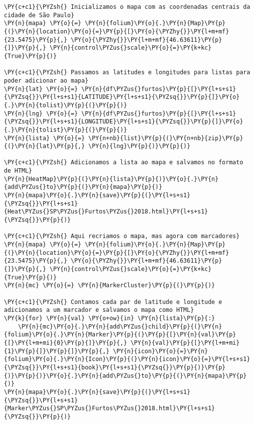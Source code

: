     \begin{tcolorbox}[breakable, size=fbox, boxrule=1pt, pad at break*=1mm,colback=cellbackground, colframe=cellborder]
\begin{Verbatim}[commandchars=\\\{\}]
\PY{c+c1}{\PYZsh{} Inicializamos o mapa com as coordenadas centrais da cidade de São Paulo}
\PY{n}{mapa} \PY{o}{=} \PY{n}{folium}\PY{o}{.}\PY{n}{Map}\PY{p}{(}\PY{n}{location}\PY{o}{=}\PY{p}{[}\PY{o}{\PYZhy{}}\PY{l+m+mf}{23.5475}\PY{p}{,} \PY{o}{\PYZhy{}}\PY{l+m+mf}{46.63611}\PY{p}{]}\PY{p}{,} \PY{n}{control\PYZus{}scale}\PY{o}{=}\PY{k+kc}{True}\PY{p}{)}

\PY{c+c1}{\PYZsh{} Passamos as latitudes e longitudes para listas para poder adicionar ao mapa}
\PY{n}{lat} \PY{o}{=} \PY{n}{df\PYZus{}furtos}\PY{p}{[}\PY{l+s+s1}{\PYZsq{}}\PY{l+s+s1}{LATITUDE}\PY{l+s+s1}{\PYZsq{}}\PY{p}{]}\PY{o}{.}\PY{n}{tolist}\PY{p}{(}\PY{p}{)}
\PY{n}{lng} \PY{o}{=} \PY{n}{df\PYZus{}furtos}\PY{p}{[}\PY{l+s+s1}{\PYZsq{}}\PY{l+s+s1}{LONGITUDE}\PY{l+s+s1}{\PYZsq{}}\PY{p}{]}\PY{o}{.}\PY{n}{tolist}\PY{p}{(}\PY{p}{)}
\PY{n}{lista} \PY{o}{=} \PY{n+nb}{list}\PY{p}{(}\PY{n+nb}{zip}\PY{p}{(}\PY{n}{lat}\PY{p}{,} \PY{n}{lng}\PY{p}{)}\PY{p}{)}

\PY{c+c1}{\PYZsh{} Adicionamos a lista ao mapa e salvamos no formato de HTML}
\PY{n}{HeatMap}\PY{p}{(}\PY{n}{lista}\PY{p}{)}\PY{o}{.}\PY{n}{add\PYZus{}to}\PY{p}{(}\PY{n}{mapa}\PY{p}{)}
\PY{n}{mapa}\PY{o}{.}\PY{n}{save}\PY{p}{(}\PY{l+s+s1}{\PYZsq{}}\PY{l+s+s1}{Heat\PYZus{}SP\PYZus{}Furtos\PYZus{}2018.html}\PY{l+s+s1}{\PYZsq{}}\PY{p}{)}

\PY{c+c1}{\PYZsh{} Aqui recriamos o mapa, mas agora com marcadores}
\PY{n}{mapa} \PY{o}{=} \PY{n}{folium}\PY{o}{.}\PY{n}{Map}\PY{p}{(}\PY{n}{location}\PY{o}{=}\PY{p}{[}\PY{o}{\PYZhy{}}\PY{l+m+mf}{23.5475}\PY{p}{,} \PY{o}{\PYZhy{}}\PY{l+m+mf}{46.63611}\PY{p}{]}\PY{p}{,} \PY{n}{control\PYZus{}scale}\PY{o}{=}\PY{k+kc}{True}\PY{p}{)}
\PY{n}{mc} \PY{o}{=} \PY{n}{MarkerCluster}\PY{p}{(}\PY{p}{)}

\PY{c+c1}{\PYZsh{} Contamos cada par de latitude e longitude e adicionamos a um marcador e salvamos o mapa como HTML}
\PY{k}{for} \PY{n}{val} \PY{o+ow}{in} \PY{n}{lista}\PY{p}{:}
    \PY{n}{mc}\PY{o}{.}\PY{n}{add\PYZus{}child}\PY{p}{(}\PY{n}{folium}\PY{o}{.}\PY{n}{Marker}\PY{p}{(}\PY{p}{[}\PY{n}{val}\PY{p}{[}\PY{l+m+mi}{0}\PY{p}{]}\PY{p}{,} \PY{n}{val}\PY{p}{[}\PY{l+m+mi}{1}\PY{p}{]}\PY{p}{]}\PY{p}{,} \PY{n}{icon}\PY{o}{=}\PY{n}{folium}\PY{o}{.}\PY{n}{Icon}\PY{p}{(}\PY{n}{icon}\PY{o}{=}\PY{l+s+s1}{\PYZsq{}}\PY{l+s+s1}{book}\PY{l+s+s1}{\PYZsq{}}\PY{p}{)}\PY{p}{)}\PY{p}{)}\PY{o}{.}\PY{n}{add\PYZus{}to}\PY{p}{(}\PY{n}{mapa}\PY{p}{)}
\PY{n}{mapa}\PY{o}{.}\PY{n}{save}\PY{p}{(}\PY{l+s+s1}{\PYZsq{}}\PY{l+s+s1}{Marker\PYZus{}SP\PYZus{}Furtos\PYZus{}2018.html}\PY{l+s+s1}{\PYZsq{}}\PY{p}{)}
\end{Verbatim}
\end{tcolorbox}

